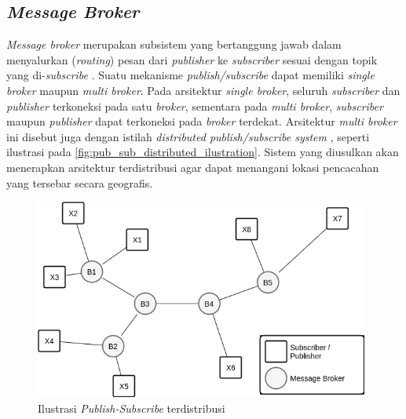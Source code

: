 \subsection{\textit{Message Broker}}
\label{ssec:message-broker}
\textit{Message broker} merupakan subsistem yang bertanggung jawab dalam menyalurkan (\textit{routing}) pesan dari \textit{publisher} ke \textit{subscriber} sesuai dengan topik yang di-\textit{subscribe} \citep{banavar_efficient_1999}. Suatu mekanisme \textit{publish/subscribe} dapat memiliki \textit{single broker} maupun \textit{multi broker}. Pada arsitektur \textit{single broker}, seluruh \textit{subscriber} dan \textit{publisher} terkoneksi pada satu \textit{broker}, sementara pada \textit{multi broker}, \textit{subscriber} maupun \textit{publisher} dapat terkoneksi pada \textit{broker} terdekat. Arsitektur \textit{multi broker} ini disebut juga dengan istilah \textit{distributed publish/subscribe system} \citep{muhl_large-scale_2002}, seperti ilustrasi pada \autoref{fig:pub_sub_distributed_ilustration}. Sistem yang diusulkan akan menerapkan arsitektur terdistribusi agar dapat menangani lokasi pencacahan yang tersebar secara geografis.


\begin{figure}[!]
	\centering
	\includegraphics[width=11cm]{Resources/Images/pub_sub_distributed_ilustration}
	\caption{Ilustrasi \textit{Publish-Subscribe} terdistribusi}
	\label{fig:pub_sub_distributed_ilustration}
\end{figure}


